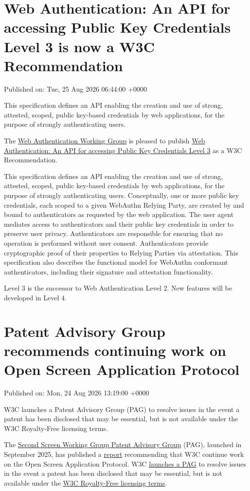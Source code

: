 \documentclass[11pt,a4paper]{article}
\begin{document}
\section{Web Authentication: An API for accessing Public Key Credentials Level 3 is now a W3C Recommendation}

Published on: Tue, 25 Aug 2026 06:44:00 +0000

This specification defines an API enabling the creation and use of strong, attested, scoped, public key-based credentials by web applications, for the purpose of strongly authenticating users.

The \href{https://www.w3.org/groups/wg/webauthn/}{Web Authentication Working Group} is pleased to publish \href{https://www.w3.org/TR/2026/REC-webauthn-3-20260825/}{Web Authentication: An API for accessing Public Key Credentials Level 3} as a W3C Recommendation.

This specification defines an API enabling the creation and use of strong, attested, scoped, public key-based credentials by web applications, for the purpose of strongly authenticating users. Conceptually, one or more public key credentials, each scoped to a given WebAuthn Relying Party, are created by and bound to authenticators as requested by the web application. The user agent mediates access to authenticators and their public key credentials in order to preserve user privacy. Authenticators are responsible for ensuring that no operation is performed without user consent. Authenticators provide cryptographic proof of their properties to Relying Parties via attestation. This specification also describes the functional model for WebAuthn conformant authenticators, including their signature and attestation functionality.

Level 3 is the successor to Web Authentication Level 2. New features will be developed in Level 4.

\section{Patent Advisory Group recommends continuing work on Open Screen Application Protocol}

Published on: Mon, 24 Aug 2026 13:19:00 +0000

W3C launches a Patent Advisory Group (PAG) to resolve issues in the event a patent has been disclosed that may be essential, but is not available under the W3C Royalty-Free licensing terms.

The \href{https://www.w3.org/2025/06/secondscreen-pag/}{Second Screen Working Group Patent Advisory Group} (PAG), launched in September 2025, has published a \href{https://www.w3.org/2025/06/secondscreen-pag/report.html}{report} recommending that W3C continue work on the Open Screen Application Protocol. W3C \href{https://www.w3.org/policies/patent-policy/\#sec-Exception}{launches a PAG} to resolve issues in the event a patent has been disclosed that may be essential, but is not available under the \href{https://www.w3.org/policies/patent-policy/\#sec-Requirements}{W3C Royalty-Free licensing terms}.
\end{document}
